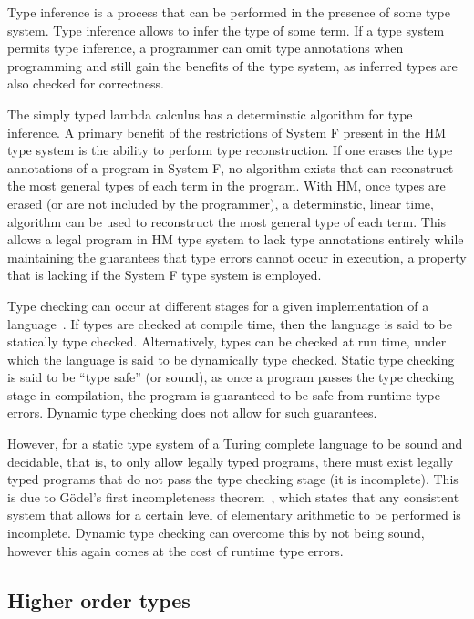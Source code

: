 Type inference is a process that can be performed in the presence of some type system. Type inference allows to infer the type of some term. If a type system permits type inference, a programmer can omit type annotations when programming and still gain the benefits of the type system, as inferred types are also checked for correctness.

The simply typed lambda calculus has a determinstic algorithm for type inference. A primary benefit of the restrictions of System F present in the HM type system is the ability to perform type reconstruction. If one erases the type annotations of a program in System F, no algorithm exists that can reconstruct the most general types of each term in the program. With HM, once types are erased (or are not included by the programmer), a determinstic, linear time, algorithm can be used to reconstruct the most general type of each term. This allows a legal program in HM type system to lack type annotations entirely while maintaining the guarantees that type errors cannot occur in execution, a property that is lacking if the System F type system is employed. 

Type checking can occur at different stages for a given implementation of a language~\cite{strachey2000fundamental}. If types are checked at compile time, then the language is said to be statically type checked. Alternatively, types can be checked at run time, under which the language is said to be dynamically type checked. Static type checking is said to be ``type safe'' (or sound), as once a program passes the type checking stage in compilation, the program is guaranteed to be safe from runtime type errors. Dynamic type checking does not allow for such guarantees. 

However, for a static type system of a Turing complete language to be sound and decidable, that is, to only allow legally typed programs, there must exist legally typed programs that do not pass the type checking stage (it is incomplete). This is due to G\"odel's first incompleteness theorem~\cite{godel1992formally}, which states that any consistent system that allows for a certain level of elementary arithmetic to be performed is incomplete. Dynamic type checking can overcome this by not being sound, however this again comes at the cost of runtime type errors. 

\subsection{Higher order types}


